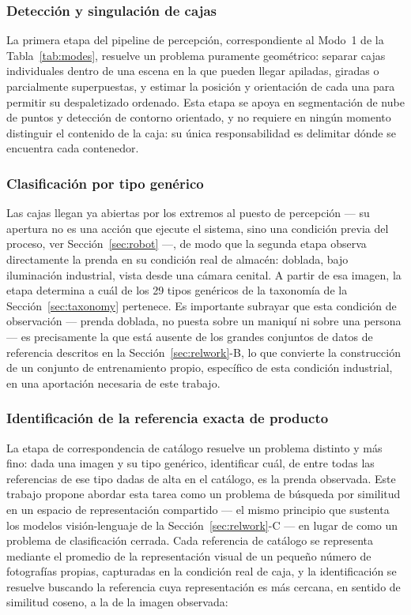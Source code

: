 \documentclass[conference]{IEEEtran}
\begin{document}
\subsubsection{Detección y singulación de cajas}

La primera etapa del pipeline de percepción, correspondiente al Modo~1 de la
Tabla~\ref{tab:modes}, resuelve un problema puramente geométrico: separar
cajas individuales dentro de una escena en la que pueden llegar apiladas,
giradas o parcialmente superpuestas, y estimar la posición y orientación de
cada una para permitir su despaletizado ordenado. Esta etapa se apoya en
segmentación de nube de puntos y detección de contorno orientado, y no
requiere en ningún momento distinguir el contenido de la caja: su única
responsabilidad es delimitar dónde se encuentra cada contenedor.

\subsubsection{Clasificación por tipo genérico}

Las cajas llegan ya abiertas por los extremos al puesto de percepción --- su
apertura no es una acción que ejecute el sistema, sino una condición previa
del proceso, ver Sección~\ref{sec:robot} ---, de modo que la segunda etapa
observa directamente la prenda en su condición real de almacén: doblada,
bajo iluminación industrial, vista desde una cámara cenital. A partir de esa
imagen, la etapa determina a cuál de los 29 tipos genéricos de la
taxonomía de la Sección~\ref{sec:taxonomy} pertenece. Es importante subrayar
que esta condición de observación --- prenda doblada, no puesta sobre un
maniquí ni sobre una persona --- es precisamente la que está ausente de los
grandes conjuntos de datos de referencia descritos en la
Sección~\ref{sec:relwork}-B, lo que convierte la construcción de un conjunto
de entrenamiento propio, específico de esta condición industrial, en una
aportación necesaria de este trabajo.

\subsubsection{Identificación de la referencia exacta de producto}

La etapa de correspondencia de catálogo resuelve un problema distinto y más
fino: dada una imagen y su tipo genérico, identificar cuál, de entre todas
las referencias de ese tipo dadas de alta en el catálogo, es la prenda
observada. Este trabajo propone abordar esta tarea como un problema de
búsqueda por similitud en un espacio de representación compartido --- el
mismo principio que sustenta los modelos visión-lenguaje de la
Sección~\ref{sec:relwork}-C --- en lugar de como un problema de
clasificación cerrada. Cada referencia de catálogo se representa mediante el
promedio de la representación visual de un pequeño número de fotografías
propias, capturadas en la condición real de caja, y la identificación se
resuelve buscando la referencia cuya representación es más cercana, en
sentido de similitud coseno, a la de la imagen observada:
\end{document}
